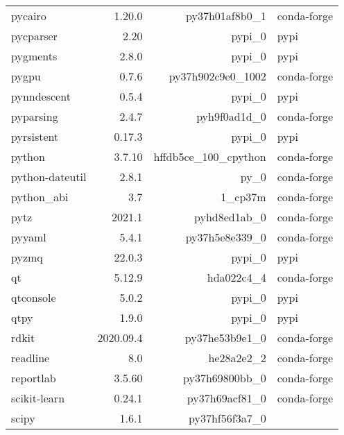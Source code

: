 \begin{table}
\begin{center}
\begin{tabular}{|l|r|r|l|}
			pycairo &1.20.0 & py37h01af8b0\_1 &conda-forge \\
			pycparser &2.20 & pypi\_0 &pypi \\
			pygments &2.8.0 & pypi\_0 &pypi \\
			pygpu &0.7.6 & py37h902c9e0\_1002 & conda-forge \\
			pynndescent &0.5.4 & pypi\_0 &pypi \\
			pyparsing &2.4.7 & pyh9f0ad1d\_0 &conda-forge \\
			pyrsistent &0.17.3 & pypi\_0 &pypi \\
			python &3.7.10 & hffdb5ce\_100\_cpython &conda-forge \\
			python-dateutil &2.8.1 & py\_0 &conda-forge \\
			python\_abi &3.7 & 1\_cp37m &conda-forge \\
			pytz &2021.1 & pyhd8ed1ab\_0 &conda-forge \\
			pyyaml &5.4.1 & py37h5e8e339\_0 &conda-forge \\
			pyzmq &22.0.3 & pypi\_0 &pypi \\
			qt &5.12.9 & hda022c4\_4 &conda-forge \\
			qtconsole &5.0.2 & pypi\_0 &pypi \\
			qtpy &1.9.0 & pypi\_0 &pypi \\
			rdkit &2020.09.4 & py37he53b9e1\_0 &conda-forge \\
			readline &8.0 & he28a2e2\_2 &conda-forge \\
			reportlab &3.5.60 & py37h69800bb\_0 &conda-forge \\
			scikit-learn &0.24.1 & py37h69acf81\_0 &conda-forge \\
			scipy &1.6.1 & py37hf56f3a7\_0 & \\
			
			
			
		\end{tabular}
	\end{center}
\end{table}	

